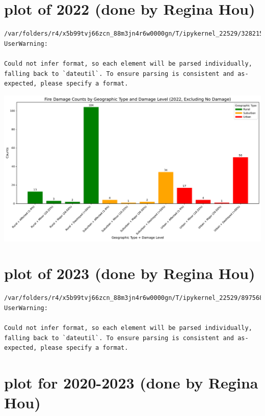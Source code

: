 \documentclass[
  letterpaper,
  DIV=11,
  numbers=noendperiod]{scrartcl}
\begin{document}
\section{plot of 2022 (done by Regina
Hou)}\label{plot-of-2022-done-by-regina-hou}

\begin{verbatim}
/var/folders/r4/x5b99tvj66zcn_88m3jn4r6w0000gn/T/ipykernel_22529/3282159924.py:2: UserWarning:

Could not infer format, so each element will be parsed individually, falling back to `dateutil`. To ensure parsing is consistent and as-expected, please specify a format.
\end{verbatim}

\includegraphics{Final Writeup_files/figure-pdf/cell-16-output-1.pdf}

\section{plot of 2023 (done by Regina
Hou)}\label{plot-of-2023-done-by-regina-hou}

\begin{verbatim}
/var/folders/r4/x5b99tvj66zcn_88m3jn4r6w0000gn/T/ipykernel_22529/897568859.py:2: UserWarning:

Could not infer format, so each element will be parsed individually, falling back to `dateutil`. To ensure parsing is consistent and as-expected, please specify a format.
\end{verbatim}

\section{plot for 2020-2023 (done by Regina
Hou)}\label{plot-for-2020-2023-done-by-regina-hou}
\end{document}
